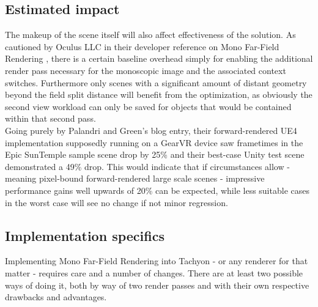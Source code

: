 \subsection{Estimated impact}
The makeup of the scene itself will also affect effectiveness of the solution. As cautioned by Oculus LLC in their developer reference on Mono Far-Field Rendering \cite{Palandri.2016}, there is a certain baseline overhead simply for enabling the additional render pass necessary for the monoscopic image and the associated context switches. Furthermore only scenes with a significant amount of distant geometry beyond the field split distance will benefit from the optimization, as obviously the second view workload can only be saved for objects that would be contained within that second pass. \\
Going purely by Palandri and Green's blog entry, their forward-rendered UE4 implementation supposedly running on a GearVR device saw frametimes in the Epic SunTemple sample scene drop by 25\% and their best-case Unity test scene demonstrated a 49\% drop\cite{Palandri.2016}. 
This would indicate that if circumstances allow - meaning pixel-bound forward-rendered large scale scenes - impressive performance gains well upwards of 20\% can be expected, while less suitable cases in the worst case will see no change if not minor regression. 

\subsection{Implementation specifics}
Implementing Mono Far-Field Rendering into Tachyon - or any renderer for that matter - requires care and a number of changes. There are at least two possible ways of doing it, both by way of two render passes and with their own respective drawbacks and advantages. 
